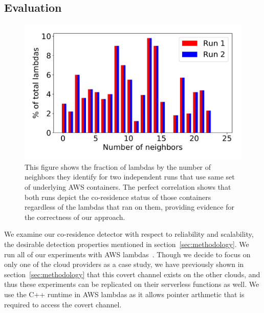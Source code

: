 \subsection{Evaluation}
\label{sec:eval}

\begin{figure}[!t]
  \includegraphics[width=.99\linewidth]{fig/correlation.pdf}
  \caption{This figure shows the fraction of lambdas by the number of neighbors 
  they identify for two independent runs that use same set of underlying AWS
  containers. The perfect correlation shows that both runs depict the co-residence 
  status of those containers regardless of the lambdas that ran on them, providing
  evidence for the correctness of our approach.
\label{fig:correlation}}
\end{figure}


We examine our co-residence detector with respect to reliability and
scalability, the desirable detection properties mentioned in
section~\ref{sec:methodology}.  We run all of our experiments with AWS
lambdas~\cite{awscloud}. Though we decide to focus on only one of the cloud
providers as a case study, we have previously shown in
section~\ref{sec:methodology} that this covert channel exists on the other
clouds, and thus these experiments can be replicated on their serverless
functions as well. We use the C++ runtime in AWS lambdas as it allows pointer
arthmetic that is required to access the covert channel.

